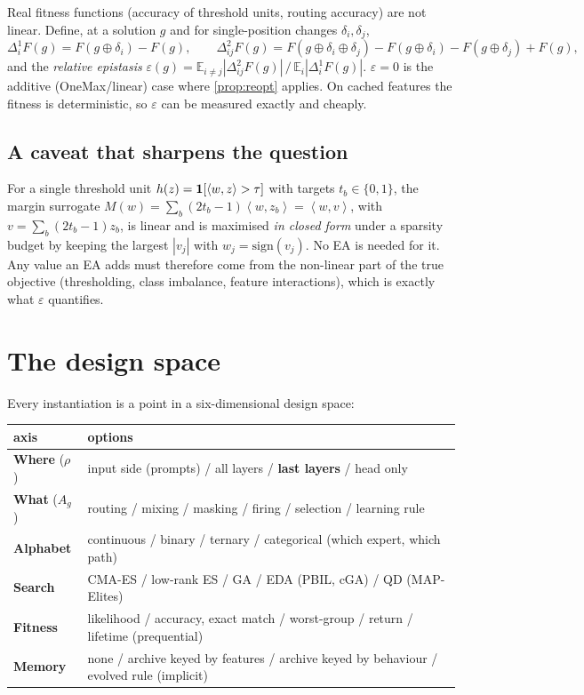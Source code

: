 \documentclass[11pt,a4paper]{article}
\theoremstyle{definition}
\theoremstyle{plain}
\theoremstyle{remark}
\newcommand{\E}{\mathbb{E}}
\newcommand{\ind}[1]{\one\!\left[#1\right]}
\newcommand{\ip}[2]{\left\langle #1, #2 \right\rangle}
\begin{document}
Real fitness functions (accuracy of threshold units, routing accuracy) are not linear. Define, at a solution $g$ and for single-position changes $\delta_i,\delta_j$,
\begin{equation}
\Delta^1_i F(g) = F(g\oplus\delta_i) - F(g), \qquad
\Delta^2_{ij} F(g) = F(g\oplus\delta_i\oplus\delta_j) - F(g\oplus\delta_i) - F(g\oplus\delta_j) + F(g),
\end{equation}
and the \emph{relative epistasis} $\varepsilon(g) = \E_{i\ne j}|\Delta^2_{ij}F(g)|\,/\,\E_i|\Delta^1_iF(g)|$. $\varepsilon = 0$ is the additive (OneMax/linear) case where \cref{prop:reopt} applies. On cached features the fitness is deterministic, so $\varepsilon$ can be measured exactly and cheaply.

\subsection{A caveat that sharpens the question}

For a single threshold unit $h(z)=\ind{\ip{w}{z}>\tau}$ with targets $t_b\in\{0,1\}$, the margin surrogate $M(w) = \sum_b (2t_b-1)\ip{w}{z_b} = \ip{w}{v}$, with $v = \sum_b(2t_b-1)z_b$, is linear and is maximised \emph{in closed form} under a sparsity budget by keeping the largest $|v_j|$ with $w_j = \mathrm{sign}(v_j)$. No EA is needed for it. Any value an EA adds must therefore come from the non-linear part of the true objective (thresholding, class imbalance, feature interactions), which is exactly what $\varepsilon$ quantifies.

\section{The design space}
\label{sec:design}

Every instantiation is a point in a six-dimensional design space:

\begin{center}
\small
\begin{tabularx}{\linewidth}{@{}lX@{}}
\toprule
axis & options \\
\midrule
\textbf{Where} ($\rho$) & input side (prompts) \;/\; all layers \;/\; \textbf{last layers} \;/\; head only \\
\textbf{What} ($A_g$) & routing \;/\; mixing \;/\; masking \;/\; firing \;/\; selection \;/\; learning rule \\
\textbf{Alphabet} & continuous \;/\; binary \;/\; ternary \;/\; categorical (which expert, which path) \\
\textbf{Search} & CMA-ES \;/\; low-rank ES \;/\; GA \;/\; EDA (PBIL, cGA) \;/\; QD (MAP-Elites) \\
\textbf{Fitness} & likelihood \;/\; accuracy, exact match \;/\; worst-group \;/\; return \;/\; lifetime (prequential) \\
\textbf{Memory} & none \;/\; archive keyed by features \;/\; archive keyed by behaviour \;/\; evolved rule (implicit) \\
\bottomrule
\end{tabularx}
\end{center}
\end{document}
